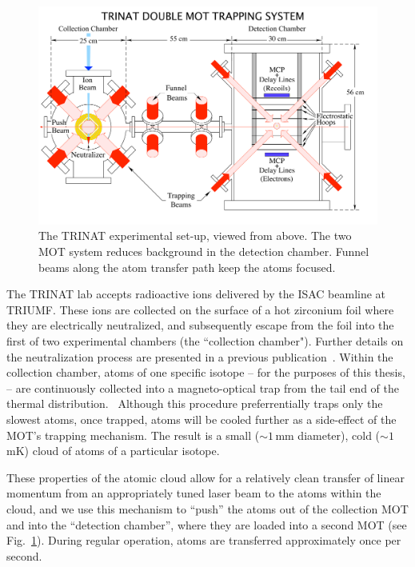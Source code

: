 \begin{figure}[t!h]
	\centering
	\includegraphics[width=.999\linewidth]
	{Figures/doublemot4.pdf}
	\caption{The TRINAT experimental set-up, viewed from above.  The two MOT system reduces background in the detection chamber.  Funnel beams along the atom transfer path keep the atoms focused.}	
	\label{fig:doublemot}
\end{figure}

The TRINAT lab accepts radioactive ions delivered by the ISAC beamline at TRIUMF.  These ions are collected on the surface of a hot zirconium foil where they are electrically neutralized, and subsequently escape from the foil into the first of two experimental chambers (the ``collection chamber").  Further details on the neutralization process are presented in a previous publication~\cite{gorelov2000}.  Within the collection chamber, atoms of one specific isotope -- for the purposes of this thesis,   -- are continuously collected into a magneto-optical trap from the tail end of the thermal distribution.~  Although this procedure preferrentially traps only the slowest atoms, once trapped, atoms will be cooled further as a side-effect of the MOT's trapping mechanism.  The result is a small ($\sim\!1\,$mm diameter), cold ($\sim\!1\,$mK) cloud of atoms of a particular isotope.  

These properties of the atomic cloud allow for a relatively clean transfer of linear momentum from an appropriately tuned laser beam to the atoms within the cloud, and we use this mechanism to ``push'' the atoms out of the collection MOT and into the ``detection chamber'', where they are loaded into a second MOT (see Fig.~\ref{fig:doublemot}).  During regular operation, atoms are transferred approximately once per second.  

